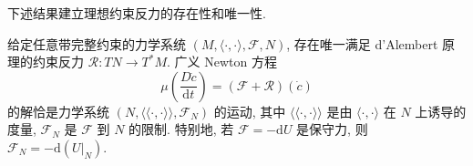 下述结果建立理想约束反力的存在性和唯一性.

\begin{RiemannTheorem}\label{thm:existence-and-uniqueness-of-perfect-reaction}
给定任意带完整约束的力学系统 $(M,\langle\cdot,\cdot\rangle,\mathcal{F},N)$, 存在唯一满足 d’Alembert 原理的约束反力 $\mathcal{R}:TN\to T^*M$. 广义 Newton 方程
\[
  \mu\left(\frac{D\dot c}{\mathrm{d}t}\right)
  =(\mathcal{F}+\mathcal{R})(\dot c)
\]
的解恰是力学系统 $(N,\langle\!\langle\cdot,\cdot\rangle\!\rangle,\mathcal{F}_N)$ 的运动, 其中 $\langle\!\langle\cdot,\cdot\rangle\!\rangle$ 是由 $\langle\cdot,\cdot\rangle$ 在 $N$ 上诱导的度量, $\mathcal{F}_N$ 是 $\mathcal{F}$ 到 $N$ 的限制. 特别地, 若 $\mathcal{F}=-\mathrm{d}U$ 是保守力, 则 $\mathcal{F}_N=-\mathrm{d}(U|_N)$.
\end{RiemannTheorem}

